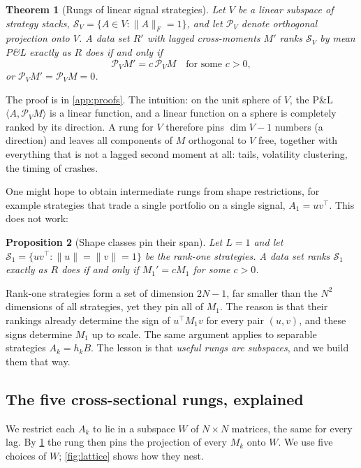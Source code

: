 \documentclass[11pt]{article}
\newtheorem{theorem}{Theorem}
\newtheorem{proposition}[theorem]{Proposition}
\theoremstyle{definition}
\theoremstyle{remark}
\newcommand{\ip}[2]{\langle #1, #2 \rangle}
\newcommand{\Proj}{\mathcal{P}}
\begin{document}
\begin{theorem}[Rungs of linear signal strategies]\label{thm:main}
Let $V$ be a linear subspace of strategy stacks, $\mathcal{S}_V=\{A\in V:\|A\|_F=1\}$, and let $\Proj_V$ denote orthogonal projection
onto $V$. A data set $R'$ with lagged cross-moments $M'$ ranks $\mathcal{S}_V$ by mean P\&L exactly as $R$ does if and only if
\[
  \Proj_V M' = c\,\Proj_V M \quad\text{for some } c>0,
\]
or $\Proj_V M'=\Proj_V M=0$.
\end{theorem}

The proof is in \cref{app:proofs}. The intuition: on the unit sphere of $V$, the P\&L $\ip{A}{\Proj_V M}$ is a linear function, and a
linear function on a sphere is completely ranked by its direction. A rung for $V$ therefore pins $\dim V-1$ numbers (a direction)
and leaves all components of $M$ orthogonal to $V$ free, together with everything that is not a lagged second moment at all:
tails, volatility clustering, the timing of crashes.

One might hope to obtain intermediate rungs from shape restrictions, for example strategies that trade a single portfolio on a single
signal, $A_1=uv^\top$. This does not work:

\begin{proposition}[Shape classes pin their span]\label{prop:rankone}
Let $L=1$ and let $\mathcal{S}_1=\{uv^\top:\|u\|=\|v\|=1\}$ be the rank-one strategies. A data set ranks $\mathcal{S}_1$ exactly as $R$ does if
and only if $M_1'=cM_1$ for some $c>0$.
\end{proposition}

Rank-one strategies form a set of dimension $2N-1$, far smaller than the $N^2$ dimensions of all strategies, yet they pin all of $M_1$.
The reason is that their rankings already determine the sign of $u^\top M_1 v$ for every pair $(u,v)$, and these signs determine $M_1$ up to scale.
The same argument applies to separable strategies $A_k=h_kB$. The lesson is that \emph{useful rungs are subspaces}, and we build them that way.

\subsection{The five cross-sectional rungs, explained}
\label{sec:five}

We restrict each $A_k$ to lie in a subspace $W$ of $N\times N$ matrices, the same for every lag. By \cref{thm:main} the rung then pins the
projection of every $M_k$ onto $W$. We use five choices of $W$; \cref{fig:lattice} shows how they nest.
\end{document}
